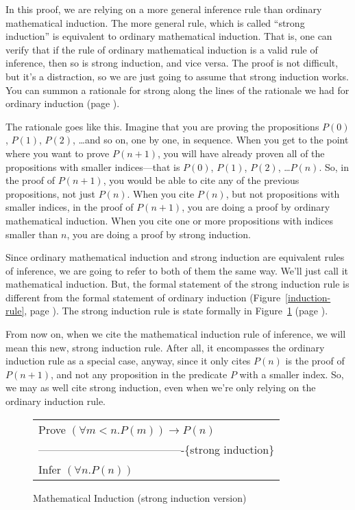 In this proof, we are relying on a more general inference rule
than ordinary mathematical induction.
The more general rule, which is called ``strong induction''
is equivalent to ordinary mathematical induction.
That is, one can verify that if the rule of ordinary mathematical induction
is a valid rule of inference, then so is strong induction, and vice versa.
The proof is not difficult, but it's a distraction,
so we are just going to assume that strong induction works.
You can summon a rationale for strong along the lines
of the rationale we had for ordinary induction (page \pageref{induction-rationale}).

\label{strong-induction-rationale}
The rationale goes like this.
Imagine that you are proving the propositions
$P(0)$, $P(1)$, $P(2)$, \dots and so on,
one by one, in sequence.
When you get to the point where you want to prove $P(n+1)$,
you will have already proven all of the propositions
with smaller indices---that is
$P(0)$, $P(1)$, $P(2)$, \dots $P(n)$.
So, in the proof of $P(n+1)$, you would be able to
cite any of the previous propositions, not just $P(n)$.
When you cite $P(n)$, but not propositions with smaller indices,
in the proof of $P(n+1)$, you are doing a proof by ordinary mathematical induction.
When you cite one or more propositions with indices smaller than $n$,
you are doing a proof by strong induction.

Since ordinary mathematical induction and strong induction are
equivalent rules of inference, we are going to refer to both of
them the same way. We'll just call it mathematical induction.
But, the formal statement of the strong induction rule
is different from the formal statement of ordinary induction
(Figure~\ref{induction-rule}, page \pageref{induction-rule}).
The strong induction rule is state formally in
Figure~\ref{strong-induction-rule} (page \pageref{strong-induction-rule}).

From now on, when we cite the mathematical induction rule of inference,
we will mean this new, strong induction rule.
After all, it encompasses the ordinary induction rule
as a special case, anyway, since it only cites $P(n)$ is the proof
of $P(n+1)$, and not any proposition in the predicate $P$ with a smaller index.
So, we may as well cite strong induction, even when we're only relying
on the ordinary induction rule.

\begin{figure}
\begin{center}
\begin{tabular}{l}
Prove $(\forall m<n.P(m))\rightarrow P(n)$ \\
----------------------------------------\{strong induction\}\\
Infer $(\forall n.P(n))$
\end{tabular}
\end{center}
\caption{Mathematical Induction (strong induction version)}
\label{strong-induction-rule}
\end{figure}

